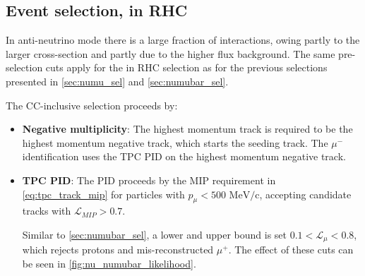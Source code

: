 \subsection{Event selection, \numu in RHC}
\label{sec:numu_in_nubar_sel}
In anti-neutrino mode there is a large fraction of \numu interactions, owing partly to the larger \numu cross-section and partly due to the higher flux background. The same pre-selection cuts apply for the \numu in RHC selection as for the previous selections presented in \autoref{sec:numu_sel} and \autoref{sec:numubar_sel}.

The CC-inclusive selection proceeds by:
\begin{itemize}
	\item \textbf{Negative multiplicity}: The highest momentum track is required to be the highest momentum negative track, which starts the seeding track. The $\mu^-$ identification uses the TPC PID on the highest momentum negative track. 
	
	\item \textbf{TPC PID}: The PID proceeds by the MIP requirement in \autoref{eq:tpc_track_mip} for particles with $p_\mu < 500 \text{ MeV/c}$, accepting candidate tracks with $\mathcal{L}_{MIP} > 0.7$.
	
	Similar to \autoref{sec:numubar_sel}, a lower and upper bound is set $0.1 < \mathcal{L}_\mu < 0.8$, which rejects protons and mis-reconstructed $\mu^+$. The effect of these cuts can be seen in \autoref{fig:nu_numubar_likelihood}.
\end{itemize}

